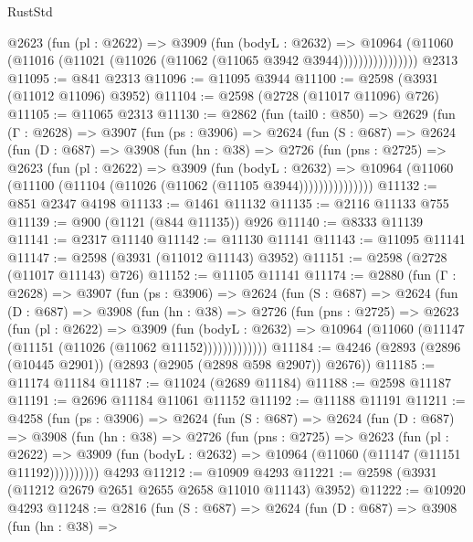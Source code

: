 \begin{lexlean}{RustStd}
\begin{coremodule}
                  @2623
                    (fun (pl : @2622) =>
                    @3909
                      (fun (bodyL : @2632) =>
                      @10964
                        (@11060 (@11016 (@11021 (@11026 (@11062 (@11065 @3942 @3944))))))))))))))))
    @2313
@11095 := @841 @2313
@11096 := @11095 @3944
@11100 := @2598 (@3931 (@11012 @11096) @3952)
@11104 := @2598 (@2728 (@11017 @11096) @726)
@11105 := @11065 @2313
@11130 := @2862
    (fun (tail0 : @850) =>
    @2629
      (fun (Γ : @2628) =>
      @3907
        (fun (ps : @3906) =>
        @2624
          (fun (S : @687) =>
          @2624
            (fun (D : @687) =>
            @3908
              (fun (hn : @38) =>
              @2726
                (fun (pns : @2725) =>
                @2623
                  (fun (pl : @2622) =>
                  @3909
                    (fun (bodyL : @2632) =>
                    @10964 (@11060 (@11100 (@11104 (@11026 (@11062 (@11105 @3944)))))))))))))))
@11132 := @851 @2347 @4198
@11133 := @1461 @11132
@11135 := @2116 @11133 @755
@11139 := @900 (@1121 (@844 @11135)) @926
@11140 := @8333 @11139
@11141 := @2317 @11140
@11142 := @11130 @11141
@11143 := @11095 @11141
@11147 := @2598 (@3931 (@11012 @11143) @3952)
@11151 := @2598 (@2728 (@11017 @11143) @726)
@11152 := @11105 @11141
@11174 := @2880
    (fun (Γ : @2628) =>
    @3907
      (fun (ps : @3906) =>
      @2624
        (fun (S : @687) =>
        @2624
          (fun (D : @687) =>
          @3908
            (fun (hn : @38) =>
            @2726
              (fun (pns : @2725) =>
              @2623
                (fun (pl : @2622) =>
                @3909
                  (fun (bodyL : @2632) =>
                  @10964 (@11060 (@11147 (@11151 (@11026 (@11062 @11152)))))))))))))
@11184 := @4246 (@2893 (@2896 (@10445 @2901)) (@2893 (@2905 (@2898 @598 @2907)) @2676))
@11185 := @11174 @11184
@11187 := @11024 (@2689 @11184)
@11188 := @2598 @11187
@11191 := @2696 @11184 @11061 @11152
@11192 := @11188 @11191
@11211 := @4258
    (fun (ps : @3906) =>
    @2624
      (fun (S : @687) =>
      @2624
        (fun (D : @687) =>
        @3908
          (fun (hn : @38) =>
          @2726
            (fun (pns : @2725) =>
            @2623
              (fun (pl : @2622) =>
              @3909 (fun (bodyL : @2632) => @10964 (@11060 (@11147 (@11151 @11192))))))))))
    @4293
@11212 := @10909 @4293
@11221 := @2598 (@3931 (@11212 @2679 @2651 @2655 @2658 @11010 @11143) @3952)
@11222 := @10920 @4293
@11248 := @2816
    (fun (S : @687) =>
    @2624
      (fun (D : @687) =>
      @3908
        (fun (hn : @38) =>

\end{coremodule}
\end{lexlean}
